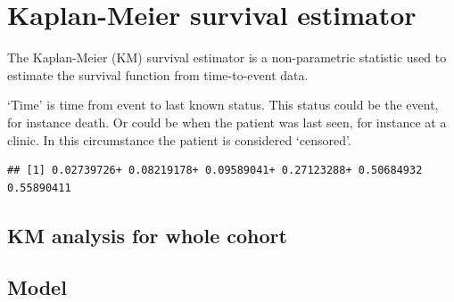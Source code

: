 \documentclass[12pt,]{krantz}
\makeatletter
\newenvironment{Shaded}{\begin{snugshade}}{\end{snugshade}}
\newcommand{\CommentTok}[1]{\textcolor[rgb]{0.56,0.35,0.01}{\textit{#1}}}
\newcommand{\DecValTok}[1]{\textcolor[rgb]{0.00,0.00,0.81}{#1}}
\newcommand{\KeywordTok}[1]{\textcolor[rgb]{0.13,0.29,0.53}{\textbf{#1}}}
\newcommand{\NormalTok}[1]{#1}
\newcommand{\OperatorTok}[1]{\textcolor[rgb]{0.81,0.36,0.00}{\textbf{#1}}}
\newcommand{\StringTok}[1]{\textcolor[rgb]{0.31,0.60,0.02}{#1}}
\newenvironment{kframe}{%
\medskip{}
\setlength{\fboxsep}{.8em}
 \def\at@end@of@kframe{}%
 \ifinner\ifhmode%
  \def\at@end@of@kframe{\end{minipage}}%
  \begin{minipage}{\columnwidth}%
 \fi\fi%
 \def\FrameCommand##1{\hskip\@totalleftmargin \hskip-\fboxsep
 \colorbox{shadecolor}{##1}\hskip-\fboxsep
     \hskip-\linewidth \hskip-\@totalleftmargin \hskip\columnwidth}%
 \MakeFramed {\advance\hsize-\width
   \@totalleftmargin\z@ \linewidth\hsize
   \@setminipage}}%
 {\par\unskip\endMakeFramed%
 \at@end@of@kframe}
\renewenvironment{Shaded}{\begin{kframe}}{\end{kframe}}
\theoremstyle{definition}
\theoremstyle{definition}
\theoremstyle{definition}
\theoremstyle{remark}
\makeatother
\begin{document}
\hypertarget{kaplan-meier-survival-estimator}{%
\section{Kaplan-Meier survival
estimator}\label{kaplan-meier-survival-estimator}}

The Kaplan-Meier (KM) survival estimator is a non-parametric statistic
used to estimate the survival function from time-to-event data.

`Time' is time from event to last known status. This status could be the
event, for instance death. Or could be when the patient was last seen,
for instance at a clinic. In this circumstance the patient is considered
`censored'.

\begin{Shaded}
\end{Shaded}

\begin{verbatim}
## [1] 0.02739726+ 0.08219178+ 0.09589041+ 0.27123288+ 0.50684932  0.55890411
\end{verbatim}

\hypertarget{km-analysis-for-whole-cohort}{%
\subsection{KM analysis for whole
cohort}\label{km-analysis-for-whole-cohort}}

\hypertarget{model}{%
\subsection{Model}\label{model}}
\end{document}
